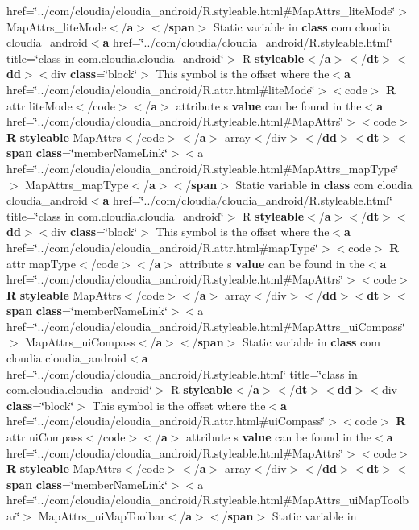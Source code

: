 {href=\char`\"{}../com/cloudia/cloudia\-\_\-android/R.\-styleable.\-html\#Map\-Attrs\-\_\-lite\-Mode\char`\"{}$>$ Map\-Attrs\-\_\-lite\-Mode$<$/{\bf a}$>$$<$/{\bf span}$>$ Static variable in {\bf class} com cloudia cloudia\-\_\-android$<${\bf a} href=\char`\"{}../com/cloudia/cloudia\-\_\-android/R.\-styleable.\-html\char`\"{} title=\char`\"{}class in com.\-cloudia.\-cloudia\-\_\-android\char`\"{}$>$ R {\bf styleable}$<$/{\bf a}$>$$<$/{\bf dt}$>$$<${\bf dd}$>$$<$div {\bf class}=\char`\"{}block\char`\"{}$>$ This symbol is the offset where the$<${\bf a} href=\char`\"{}../com/cloudia/cloudia\-\_\-android/R.\-attr.\-html\#lite\-Mode\char`\"{}$>$$<$code$>$ {\bf R} attr lite\-Mode$<$/code$>$$<$/{\bf a}$>$ attribute s {\bf value} can be found in the$<${\bf a} href=\char`\"{}../com/cloudia/cloudia\-\_\-android/R.\-styleable.\-html\#Map\-Attrs\char`\"{}$>$$<$code$>$ {\bf R} {\bf styleable} Map\-Attrs$<$/code$>$$<$/{\bf a}$>$ array$<$/div$>$$<$/{\bf dd}$>$$<${\bf dt}$>$$<${\bf span} {\bf class}=\char`\"{}member\-Name\-Link\char`\"{}$>$$<$a href=\char`\"{}../com/cloudia/cloudia\-\_\-android/R.\-styleable.\-html\#Map\-Attrs\-\_\-map\-Type\char`\"{}$>$ Map\-Attrs\-\_\-map\-Type$<$/{\bf a}$>$$<$/{\bf span}$>$ Static variable in {\bf class} com cloudia cloudia\-\_\-android$<${\bf a} href=\char`\"{}../com/cloudia/cloudia\-\_\-android/R.\-styleable.\-html\char`\"{} title=\char`\"{}class in com.\-cloudia.\-cloudia\-\_\-android\char`\"{}$>$ R {\bf styleable}$<$/{\bf a}$>$$<$/{\bf dt}$>$$<${\bf dd}$>$$<$div {\bf class}=\char`\"{}block\char`\"{}$>$ This symbol is the offset where the$<${\bf a} href=\char`\"{}../com/cloudia/cloudia\-\_\-android/R.\-attr.\-html\#map\-Type\char`\"{}$>$$<$code$>$ {\bf R} attr map\-Type$<$/code$>$$<$/{\bf a}$>$ attribute s {\bf value} can be found in the$<${\bf a} href=\char`\"{}../com/cloudia/cloudia\-\_\-android/R.\-styleable.\-html\#Map\-Attrs\char`\"{}$>$$<$code$>$ {\bf R} {\bf styleable} Map\-Attrs$<$/code$>$$<$/{\bf a}$>$ array$<$/div$>$$<$/{\bf dd}$>$$<${\bf dt}$>$$<${\bf span} {\bf class}=\char`\"{}member\-Name\-Link\char`\"{}$>$$<$a href=\char`\"{}../com/cloudia/cloudia\-\_\-android/R.\-styleable.\-html\#Map\-Attrs\-\_\-ui\-Compass\char`\"{}$>$ Map\-Attrs\-\_\-ui\-Compass$<$/{\bf a}$>$$<$/{\bf span}$>$ Static variable in {\bf class} com cloudia cloudia\-\_\-android$<${\bf a} href=\char`\"{}../com/cloudia/cloudia\-\_\-android/R.\-styleable.\-html\char`\"{} title=\char`\"{}class in com.\-cloudia.\-cloudia\-\_\-android\char`\"{}$>$ R {\bf styleable}$<$/{\bf a}$>$$<$/{\bf dt}$>$$<${\bf dd}$>$$<$div {\bf class}=\char`\"{}block\char`\"{}$>$ This symbol is the offset where the$<${\bf a} href=\char`\"{}../com/cloudia/cloudia\-\_\-android/R.\-attr.\-html\#ui\-Compass\char`\"{}$>$$<$code$>$ {\bf R} attr ui\-Compass$<$/code$>$$<$/{\bf a}$>$ attribute s {\bf value} can be found in the$<${\bf a} href=\char`\"{}../com/cloudia/cloudia\-\_\-android/R.\-styleable.\-html\#Map\-Attrs\char`\"{}$>$$<$code$>$ {\bf R} {\bf styleable} Map\-Attrs$<$/code$>$$<$/{\bf a}$>$ array$<$/div$>$$<$/{\bf dd}$>$$<${\bf dt}$>$$<${\bf span} {\bf class}=\char`\"{}member\-Name\-Link\char`\"{}$>$$<$a href=\char`\"{}../com/cloudia/cloudia\-\_\-android/R.\-styleable.\-html\#Map\-Attrs\-\_\-ui\-Map\-Toolbar\char`\"{}$>$ Map\-Attrs\-\_\-ui\-Map\-Toolbar$<$/{\bf a}$>$$<$/{\bf span}$>$ Static variable in }
